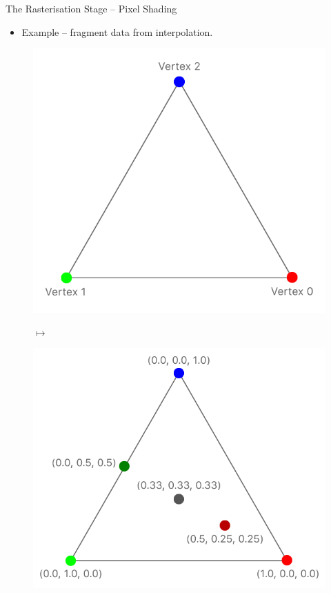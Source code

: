 \documentclass{beamer}
\begin{document}
\begin{frame}{The Rasterisation Stage -- Pixel Shading}

	\begin{itemize}
		\item Example -- fragment data from interpolation.
	\end{itemize}


	\begin{figure}
		\centering
		\begin{minipage}{.35\textwidth}
			\centering
			\includegraphics[width=.8\linewidth]{triangle}
		\end{minipage}%
		$\longmapsto$
		\begin{minipage}{.35\textwidth}
			\centering
			\includegraphics[width=.8\linewidth]{interpolation}
		\end{minipage}
	\end{figure}


\end{frame}
\end{document}
